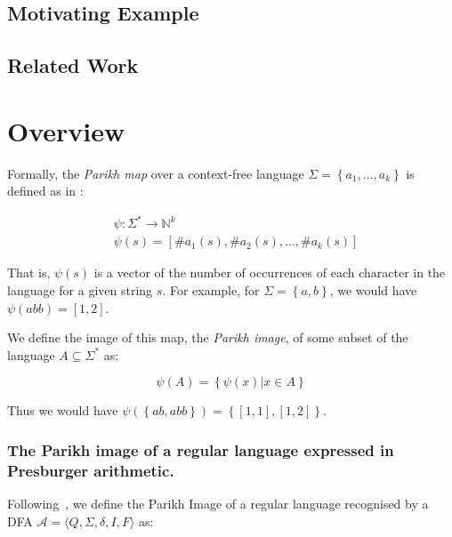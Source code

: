 \documentclass[runningheads]{llncs}
\begin{document}

\subsection{Motivating Example}

\subsection{Related Work}


\section{Overview}

Formally, the \textit{Parikh map} over a context-free language $\Sigma = \left\{a_1, \ldots, a_k \right\}$ is defined as in \cite{kozen}:

$$
\begin{aligned}
& \psi: \Sigma^* \rightarrow \mathbb{N}^k \\
& \psi(s) = \left[\#a_1(s), \#a_2(s), \ldots, \#a_k(s)\right]
\end{aligned}
$$

That is, $\psi(s)$ is a vector of the number of occurrences of each character in the language for a given string $s$. For example, for  $\Sigma = \left \{ a, b\right\}$, we would have $\psi(abb) = \left[1, 2\right]$.

We define the image of this map, the \textit{Parikh image}, of some subset of the language $A \subseteq \Sigma^*$ as:

$$
\psi(A) = \left\{ \psi(x) | x \in A \right\}
$$

Thus we would have $\psi(\left\{ab, abb\right\}) = \left\{\left[1, 1\right], \left[1, 2\right]\right\}$.

\subsubsection{The Parikh image of a regular language expressed in Presburger arithmetic.}
Following~\cite{generate-parikh-image}, we define the Parikh Image of a regular language recognised by a DFA $\mathcal{A} =  \langle Q, \Sigma,\delta, I, F \rangle$ as:
\end{document}

